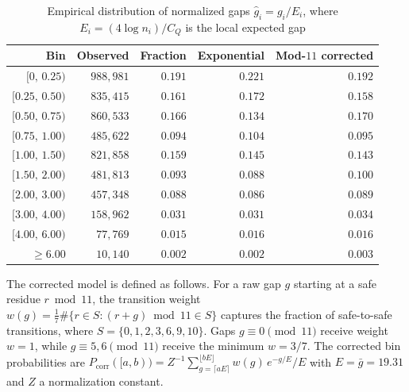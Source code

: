 \documentclass[11pt,a4paper]{article}
\theoremstyle{plain}
\theoremstyle{definition}
\theoremstyle{remark}
\begin{document}
\begin{table}[ht]
\centering
\caption{Empirical distribution of normalized gaps $\hat{g}_i = g_i / E_i$, where $E_i = (4\log n_i)/C_Q$ is the local expected gap}
\label{tab:normgap}
\smallskip
\begin{tabular}{@{}rrrrr@{}}
\toprule
Bin & Observed & Fraction & Exponential & Mod-$11$ corrected \\
\midrule
$[0,\, 0.25)$    & $988{,}981$  & $0.191$ & $0.221$ & $0.192$ \\
$[0.25,\, 0.50)$  & $835{,}415$  & $0.161$ & $0.172$ & $0.158$ \\
$[0.50,\, 0.75)$  & $860{,}533$  & $0.166$ & $0.134$ & $0.170$ \\
$[0.75,\, 1.00)$  & $485{,}622$  & $0.094$ & $0.104$ & $0.095$ \\
$[1.00,\, 1.50)$  & $821{,}858$  & $0.159$ & $0.145$ & $0.143$ \\
$[1.50,\, 2.00)$  & $481{,}813$  & $0.093$ & $0.088$ & $0.100$ \\
$[2.00,\, 3.00)$  & $457{,}348$  & $0.088$ & $0.086$ & $0.089$ \\
$[3.00,\, 4.00)$  & $158{,}962$  & $0.031$ & $0.031$ & $0.034$ \\
$[4.00,\, 6.00)$  & $77{,}769$   & $0.015$ & $0.016$ & $0.016$ \\
$\ge 6.00$       & $10{,}140$    & $0.002$ & $0.002$ & $0.003$ \\
\bottomrule
\end{tabular}
\end{table}

The corrected model is defined as follows. For a raw gap $g$ starting at a safe residue $r \bmod 11$, the transition weight $w(g) = \frac{1}{7}\#\{r \in S : (r+g) \bmod 11 \in S\}$ captures the fraction of safe-to-safe transitions, where $S = \{0,1,2,3,6,9,10\}$. Gaps $g \equiv 0 \pmod{11}$ receive weight $w = 1$, while $g \equiv 5, 6 \pmod{11}$ receive the minimum $w = 3/7$. The corrected bin probabilities are $P_{\mathrm{corr}}([a,b)) = Z^{-1}\sum_{g=\lceil aE\rceil}^{\lfloor bE\rfloor} w(g)\,e^{-g/E}/E$ with $E = \bar{g} = 19.31$ and $Z$ a normalization constant.
\end{document}
